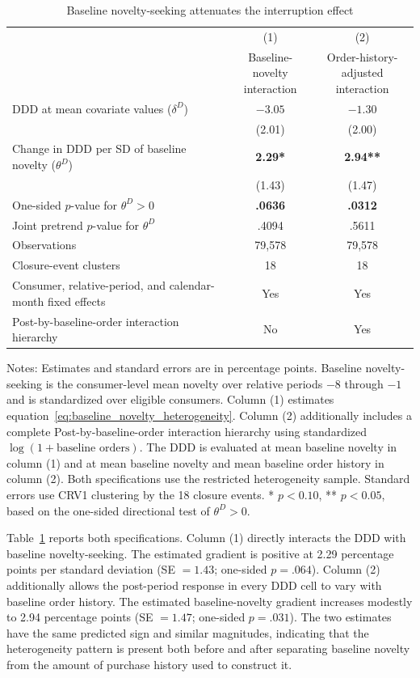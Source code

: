 \documentclass[11 pt]{article}
\newcommand\fnote[1]{\captionsetup{font=footnotesize}\caption*{#1}}
\begin{document}
\begin{table}[!ht]
\centering
\caption{Baseline novelty-seeking attenuates the interruption effect}
\label{tab:baseline_novelty_heterogeneity}
\small
\begin{tabularx}{0.95\textwidth}{Xcc}
\toprule
 & (1) & (2) \\
 & \shortstack{Baseline-novelty\\interaction} & \shortstack{Order-history-adjusted\\interaction} \\
\midrule
DDD at mean covariate values ($\delta^D$) & $-3.05$ & $-1.30$ \\
 & (2.01) & (2.00) \\
Change in DDD per SD of baseline novelty ($\theta^D$) & \textbf{2.29*} & \textbf{2.94**} \\
 & (1.43) & (1.47) \\
One-sided $p$-value for $\theta^D>0$ & \textbf{.0636} & \textbf{.0312} \\
Joint pretrend $p$-value for $\theta^D$ & .4094 & .5611 \\
Observations & 79,578 & 79,578 \\
Closure-event clusters & 18 & 18 \\
Consumer, relative-period, and calendar-month fixed effects & Yes & Yes \\
Post-by-baseline-order interaction hierarchy & No & Yes \\
\bottomrule
\end{tabularx}
\vspace{1mm}
\fnote{Notes: Estimates and standard errors are in percentage points. Baseline novelty-seeking is the consumer-level mean novelty over relative periods $-8$ through $-1$ and is standardized over eligible consumers. Column (1) estimates equation~\eqref{eq:baseline_novelty_heterogeneity}. Column (2) additionally includes a complete Post-by-baseline-order interaction hierarchy using standardized $\log(1+\text{baseline orders})$. The DDD is evaluated at mean baseline novelty in column (1) and at mean baseline novelty and mean baseline order history in column (2). Both specifications use the restricted heterogeneity sample. Standard errors use CRV1 clustering by the 18 closure events. * $p<0.10$, ** $p<0.05$, based on the one-sided directional test of $\theta^D>0$.}
\end{table}

Table~\ref{tab:baseline_novelty_heterogeneity} reports both specifications. Column (1) directly interacts the DDD with baseline novelty-seeking. The estimated gradient is positive at 2.29 percentage points per standard deviation (SE $=1.43$; one-sided $p=.064$). Column (2) additionally allows the post-period response in every DDD cell to vary with baseline order history. The estimated baseline-novelty gradient increases modestly to 2.94 percentage points (SE $=1.47$; one-sided $p=.031$). The two estimates have the same predicted sign and similar magnitudes, indicating that the heterogeneity pattern is present both before and after separating baseline novelty from the amount of purchase history used to construct it.
\end{document}
